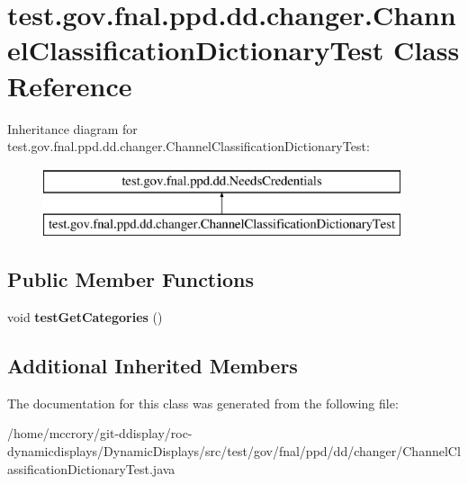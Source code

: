 \hypertarget{classtest_1_1gov_1_1fnal_1_1ppd_1_1dd_1_1changer_1_1ChannelClassificationDictionaryTest}{\section{test.\-gov.\-fnal.\-ppd.\-dd.\-changer.\-Channel\-Classification\-Dictionary\-Test Class Reference}
\label{classtest_1_1gov_1_1fnal_1_1ppd_1_1dd_1_1changer_1_1ChannelClassificationDictionaryTest}
}
Inheritance diagram for test.\-gov.\-fnal.\-ppd.\-dd.\-changer.\-Channel\-Classification\-Dictionary\-Test\-:\begin{figure}[H]
\begin{center}
\leavevmode
\includegraphics[height=2.000000cm]{classtest_1_1gov_1_1fnal_1_1ppd_1_1dd_1_1changer_1_1ChannelClassificationDictionaryTest}
\end{center}
\end{figure}
\subsection*{Public Member Functions}
\begin{DoxyCompactItemize}
\item 
\hypertarget{classtest_1_1gov_1_1fnal_1_1ppd_1_1dd_1_1changer_1_1ChannelClassificationDictionaryTest_a2c3396f83d17d27a31eefad2160e8686}{void {\bfseries test\-Get\-Categories} ()}\label{classtest_1_1gov_1_1fnal_1_1ppd_1_1dd_1_1changer_1_1ChannelClassificationDictionaryTest_a2c3396f83d17d27a31eefad2160e8686}

\end{DoxyCompactItemize}
\subsection*{Additional Inherited Members}


The documentation for this class was generated from the following file\-:\begin{DoxyCompactItemize}
\item 
/home/mccrory/git-\/ddisplay/roc-\/dynamicdisplays/\-Dynamic\-Displays/src/test/gov/fnal/ppd/dd/changer/Channel\-Classification\-Dictionary\-Test.\-java\end{DoxyCompactItemize}
